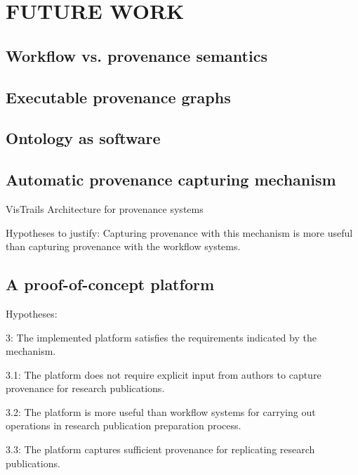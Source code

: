 \chapter{FUTURE WORK}
\label{future-work}
\section{Workflow vs. provenance semantics}

\section{Executable provenance graphs}

\section{Ontology as software}

\section{Automatic provenance capturing mechanism} 
VisTrails \cite{freire2014reproducibility}
Architecture for provenance systems \cite{groth2006architecture}

Hypotheses to justify: Capturing provenance with this mechanism is more useful than capturing provenance with the workflow systems.


\section{A proof-of-concept platform}
Hypotheses:

3: The implemented platform satisfies the requirements indicated by the mechanism.

3.1: The platform does not require explicit input from authors to capture provenance for research publications.

3.2: The platform is more useful than workflow systems for carrying out operations in research publication preparation process.

3.3: The platform captures sufficient provenance for replicating research publications.


